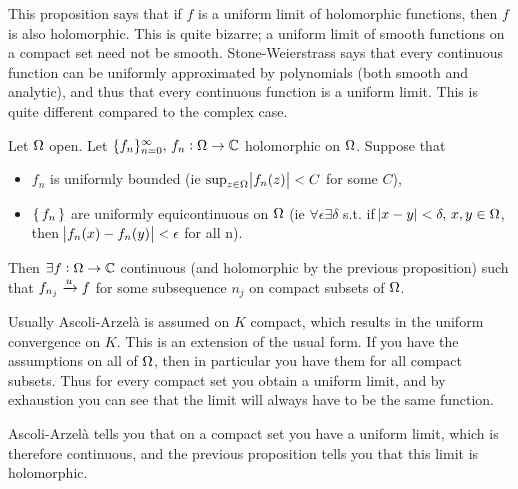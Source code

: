 \begin{note}
This proposition says that if $f$ is a uniform limit of holomorphic functions, then $f$ is also holomorphic. This is quite bizarre; a uniform limit of smooth functions on a compact set need not be smooth. Stone-Weierstrass says that every continuous function can be uniformly approximated by polynomials (both smooth and analytic), and thus that every continuous function is a uniform limit. This is quite different compared to the complex case.
\end{note}



\begin{theorem}\label{thm:ascoli-arzela}
Let $\Omega$ open. Let $\{f_n \}_{n=0}^\infty, \, f_n : \Omega \to \mathbb{C}$ holomorphic on $\Omega$. Suppose that
\begin{itemize}
    \item $f_n$ is uniformly bounded (ie $\sup_{z\in \Omega} \abs{f_n(z)} < C$ for some $C$),
    \item $\set{ f_n }$ are uniformly equicontinuous on $\Omega$ (ie $\forall \epsilon \exists \delta$ s.t. if $\abs{x-y} < \delta, \, x,y \in \Omega$, then $\abs{f_n(x) - f_n(y)} < \epsilon$ for all n).
\end{itemize}

Then $\exists f:\Omega \rightarrow \mathbb{C}$ continuous (and holomorphic by the previous proposition) such that $f_{n_j} \xrightarrow[]{u} f$ for some subsequence $n_j$ on compact subsets of $\Omega$.

\end{theorem}
 
\begin{note}\label{note:after-ascoli-arzela}
Usually Ascoli-Arzelà is assumed on $K$ compact, which results in the uniform convergence on $K$. This is an extension of the usual form. If you have the assumptions on all of $\Omega$, then in particular you have them for all compact subsets. Thus for every compact set you obtain a uniform limit, and by exhaustion you can see that the limit will always have to be the same function.

Ascoli-Arzelà tells you that on a compact set you have a uniform limit, which is therefore continuous, and the previous proposition tells you that this limit is holomorphic.
\end{note}